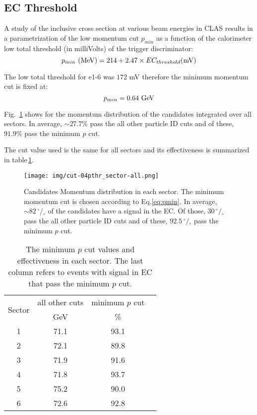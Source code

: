 \clearpage\newpage
\subsection{EC Threshold}
A study \cite{bib:ecmin} of the inclusive cross section at various beam energies in CLAS 
results in a parametrization of the low momentum cut $p_{min}$ as a function of
the calorimeter low total threshold (in milliVolts) of the trigger discriminator:
\begin{equation}
 \label{eq:pmin} 
 p_{min}\,\,{\rm (MeV)} = 214 + 2.47\times EC_{threshold}{\rm (mV)}
\end{equation}

The low total threshold for e1-6 was $172$ mV therefore the minimum momentum cut is fixed at:
$$
p_{min} = 0.64\,\,{\rm GeV}
$$

Fig.~\ref{fig:pmincut_alls} shows for the momentum distribution of the candidates integrated
over all sectors. In average, $\sim 27.7\%$  pass the all other particle ID
cuts and of these, $91.9\%$ pass the minimum $p$ cut.

The cut value used is the same for all sectors and its effectiveness is summarized in 
table\,\ref{tab:pmincut}.


\begin{figure}[ht]
  \centering
		\texttt{[image: img/cut-04pthr\_sector-all.png]}
		\caption{Candidates Momentum distribution in each sector. The minimum momentum cut is
               chosen according to Eq.\ref{eq:pmin}. In average, $\sim 82 \,^{\circ\!\!}/\!_\circ$ 
					of the candidates have a signal in the EC. Of those, $30 \,^{\circ\!\!}/\!_\circ$
					pass the all other particle ID cuts and of these, $92.5 \,^{\circ\!\!}/\!_\circ$
					pass the minimum $p$ cut.}
 		\label{fig:pmincut_alls}
\end{figure}

\clearpage



\begin{table}[h]
\label{tab:pmincut}
	\begin{center}
		\begin{tabular}{c | c | c | c}
			\hline 
			\multirow{2}{*}{Sector} 
					& all other cuts & minimum $p$ cut \\
					&  GeV & \% &  \\
			\hline 
			1   & 71.1 & 93.1 \\
			2   & 72.1 & 89.8 \\
			3   & 71.9 & 91.6 \\
			4   & 71.8 & 93.7 \\
			5   & 75.2 & 90.0 \\
			6   & 72.6 & 92.8 \\
			\hline
		\end{tabular}
		\caption{The minimum $p$ cut values and effectiveness in each sector.
					The last column refers to events with signal in EC that pass the 
 					minimum $p$ cut.}	
	
	\end{center}
\end{table}

